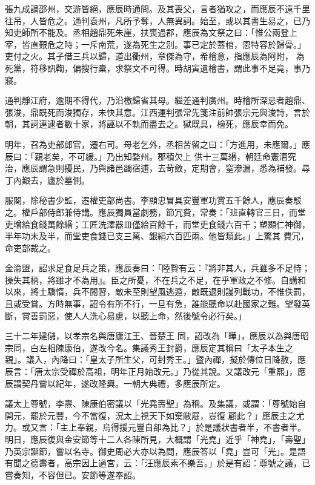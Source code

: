 \begin{pinyinscope}
 張九成謫邵州，交游皆絕，應辰時通問。及其喪父，言者猶攻之，而應辰不遠千里往吊，人皆危之。通判袁州，凡所予奪，人無異詞。始至，或以其書生易之，已乃知吏師所不能及。丞相趙鼎死朱崖，扶喪過郡，應辰為文祭之曰：「惟公兩登上宰，皆直艱危之時；一斥南荒，遂為死生之別。事已定於蓋棺，恩特容於歸骨。」吏付之火。其子借三兵以歸，道出衢州，章傑為守，希檜意，指應辰為阿附，
 為死黨，符移訊鞫，偏搜行橐，求祭文不可得。時胡寅遺檜書，謂此事不足竟，事乃寢。



 通判靜江府，逾期不得代，乃沿檄歸省其母。繼差通判廣州。時檜所深忌者趙鼎、張浚，鼎既死而浚獨存，未快其意。江西運判張常先箋注前帥張宗元與浚詩，言於朝，其詞連逮者數十家，將誣以不軌而盡去之。獄既具，檜死，應辰幸而免。



 明年，召為吏部郎官，遷右司。母老乞外，丞相苦留之曰：「方進用，未應爾。」應辰曰：「親老矣，不可緩。」乃出知婺州。郡積欠上
 供十三萬緡，朝廷命憲漕究治，應辰謂急則擾民，乃與諸邑蠲宿逋，去苛斂，定期會，窒滲漏，悉為補發。尋丁內艱去，廬於墓側。



 服闋，除秘書少監，遷權吏部尚書。李顯忠冒具安豐軍功賞五千餘人，應辰奏駁之。權戶部侍郎兼侍講。應辰獨員當劇務，節冗費，常奏：「班直轉官三日，而堂吏增給食錢萬餘緡；工匠洗澤器皿僅給百餘千，而堂吏食錢六百千；塑顯仁神御，半年功未及半，而堂吏食錢已支三萬、銀絹六百匹兩。他皆類此。」上驚其
 費冗，命吏部裁之。



 金渝盟，詔求足食足兵之策，應辰奏曰：「陸贄有云：『將非其人，兵雖多不足恃；操失其柄，將雖才不為用』。臣之所憂，不在兵之不足，在乎軍政之不修。自講和以來，將士驕惰，兵不閱習，敵未至則望風逃遁，敵既退則謾列戰功，不惟佚罰，且或受賞。方時無事，詔令有所不行，一旦有急，誰能聽命以赴國家之難。望發英斷，賞善罰惡，使人人洗心易慮，以聽上命，然後號令必行矣。」



 三十二年建儲，以孝宗名與唐廬江王、晉楚王
 同，詔改為「曄」，應辰以為與唐昭宗同，白左相陳康伯，遂改今名。集議秀王封爵，應辰定其稱曰「太子本生之親」。議入，內降曰：「皇太子所生父，可封秀王。」暨內禪，擬於傳位日降赦，應辰言：「唐太宗受禪於高祖，明年正月始改元。」乃從其說。又議改元「重熙」，應辰謂契丹嘗以紀年，遂改隆興。一朝大典禮，多應辰所定。



 議太上尊號，李燾、陳康伯密議以「光堯壽聖」為稱。及集議，或謂：「尊號始自開元，罷於元豐，今不當復，況太上視天下如棄敝屣，豈復
 顧此？」應辰主之尤力。或又言：「主上奉親，烏得援元豐自卻為比？」於是議狀書者半，不書者半。明日，應辰復與金安節等十二人各陳所見，大概謂「光堯」近乎「神堯」，「壽聖」乃英宗誕節，嘗以名寺。御史周必大亦以為問，應辰答以「堯」豈可「光」。是語有聞之德壽者，高宗因上過宮，云：「汪應辰素不樂吾。」於是有詔：尊號之議，已嘗奏知，不容但已。安節等遂奉詔。




\end{pinyinscope}
